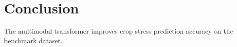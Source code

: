 \section{Conclusion}
The multimodal transformer improves crop stress prediction accuracy on the benchmark dataset.
